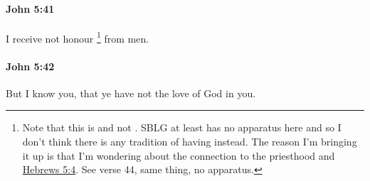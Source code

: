 		\paragraph{John 5:41} %
			\label{JOHN-5-41}

			I receive not honour%
				\footnote{%
					Note that this is  and not . SBLG at least has no apparatus here and so I don't think there is any tradition of having  instead. The reason I'm bringing it up is that I'm wondering about the connection to the priesthood and \hyperref[HEBREWS-5-4]{Hebrews 5:4}. See verse 44, same thing, no apparatus.
					}
			from men.

			\begin{framed}
			\scriptsize
				\begin{compactdesc}
					\item[SBLG] 
				\end{compactdesc}
			\end{framed}

		\paragraph{John 5:42} %
			\label{JOHN-5-42}

			But I know you, that ye have not the love of God in you.

